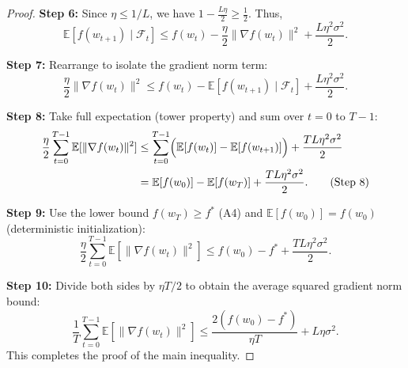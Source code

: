 \documentclass{article}
\begin{document}
\begin{proof}
\textbf{Step 6:} Since $\eta \le 1/L$, we have $1 - \frac{L\eta}{2} \ge \frac{1}{2}$. Thus,
\begin{equation}
    \mathbb{E}[f(w_{t+1}) \mid \mathcal{F}_t] \le f(w_t) - \frac{\eta}{2} \|\nabla f(w_t)\|^2 + \frac{L\eta^2\sigma^2}{2}. \tag{Step 6}
\end{equation}

\textbf{Step 7:} Rearrange to isolate the gradient norm term:
\begin{equation}
    \frac{\eta}{2} \|\nabla f(w_t)\|^2 \le f(w_t) - \mathbb{E}[f(w_{t+1}) \mid \mathcal{F}_t] + \frac{L\eta^2\sigma^2}{2}. \tag{Step 7}
\end{equation}

\textbf{Step 8:} Take full expectation (tower property) and sum over $t = 0$ to $T-1$:
\begin{align}
    \frac{\eta}{2} \sum_{t=0}^{T-1} \mathbb{E}[\|\nabla f(w_t)\|^2]
    &\le \sum_{t=0}^{T-1} \Bigl( \mathbb{E}[f(w_t)] - \mathbb{E}[f(w_{t+1})] \Bigr) + \frac{T L\eta^2\sigma^2}{2} \\
    &= \mathbb{E}[f(w_0)] - \mathbb{E}[f(w_T)] + \frac{T L\eta^2\sigma^2}{2}. \tag{Step 8}
\end{align}

\textbf{Step 9:} Use the lower bound $f(w_T) \ge f^*$ (A4) and $\mathbb{E}[f(w_0)] = f(w_0)$ (deterministic initialization):
\begin{equation}
    \frac{\eta}{2} \sum_{t=0}^{T-1} \mathbb{E}[\|\nabla f(w_t)\|^2] \le f(w_0) - f^* + \frac{T L\eta^2\sigma^2}{2}. \tag{Step 9}
\end{equation}

\textbf{Step 10:} Divide both sides by $\eta T/2$ to obtain the average squared gradient norm bound:
\begin{equation}
    \frac{1}{T} \sum_{t=0}^{T-1} \mathbb{E}[\|\nabla f(w_t)\|^2] \le \frac{2(f(w_0) - f^*)}{\eta T} + L\eta\sigma^2. \tag{Step 10}
\end{equation}
This completes the proof of the main inequality.
\end{proof}
\end{document}
